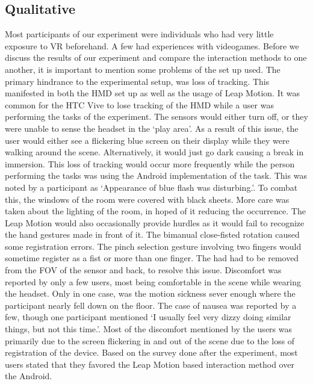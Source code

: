 \subsection{Qualitative}
Most participants of our experiment were individuals who had very little exposure to VR beforehand.
A few had experiences with videogames.
Before we discuss the results of our experiment and compare the interaction methods to one another, it is important to mention some problems of the set up used.
The primary hindrance to the experimental setup, was loss of tracking.
This manifested in both the HMD set up as well as the usage of Leap Motion.
It was common for the HTC Vive to lose tracking of the HMD while a user was performing the tasks of the experiment.
The sensors would either turn off, or they were unable to sense the headset in the ‘play area’.
As a result of this issue, the user would either see a flickering blue screen on their display while they were walking around the scene.
Alternatively, it would just go dark causing a break in immersion.
This loss of tracking would occur more frequently while the person performing the tasks was using the Android implementation of the task.
This was noted by a participant as ‘Appearance of blue flash was disturbing.’.
To combat this, the windows of the room were covered with black sheets.
More care was taken about the lighting of the room, in hoped of it reducing the occurrence.
The Leap Motion would also occasionally provide hurdles as it would fail to recognize the hand gestures made in front of it.
The bimanual close-fisted rotation caused some registration errors.
The pinch selection gesture involving two fingers would sometime register as a fist or more than one finger. The had had to be removed from the FOV of the sensor and back, to resolve this issue. 
Discomfort was reported by only a few users, most being comfortable in the scene while wearing the headset.
Only in one case, was the motion sickness sever enough where the participant nearly fell down on the floor.
The case of nausea was reported by a few, though one participant mentioned ‘I usually feel very dizzy doing similar things, but not this time.’.
Most of the discomfort mentioned by the users was primarily due to the screen flickering in and out of the scene due to the loss of registration of the device.
Based on the survey done after the experiment, most users stated that they favored the Leap Motion based interaction method over the Android.
